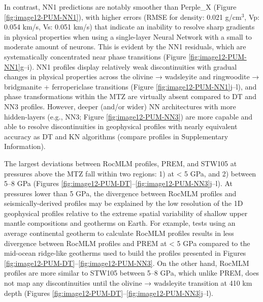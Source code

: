 \documentclass[draft,linenumbers]{agujournal2018}
\begin{document}
In contrast, NN1 predictions are notably smoother than Perple\_X (Figure \ref{fig:image12-PUM-NN1}), with higher errors (RMSE for density: 0.021 g/cm\(^3\), Vp: 0.054 km/s, Vs: 0.051 km/s) that indicate an inability to resolve sharp gradients in physical properties when using a single-layer Neural Network with a small to moderate amount of neurons. This is evident by the NN1 residuals, which are systematically concentrated near phase transitions (Figure \ref{fig:image12-PUM-NN1}g--i). NN1 profiles display relatively weak discontinuities with gradual changes in physical properties across the olivine → wadsleyite and ringwoodite → bridgmanite + ferropericlase transitions (Figure \ref{fig:image12-PUM-NN1}j--l), and phase transformations within the MTZ are virtually absent compared to DT and NN3 profiles. However, deeper (and/or wider) NN architectures with more hidden-layers (e.g., NN3; Figure \ref{fig:image12-PUM-NN3}) are more capable and able to resolve discontinuities in geophysical profiles with nearly equivalent accuracy as DT and KN algorithms (compare profiles in Supplementary Information).

The largest deviations between RocMLM profiles, PREM, and STW105 at pressures above the MTZ fall within two regions: 1) at \textless{} 5 GPa, and 2) between 5--8 GPa (Figures \ref{fig:image12-PUM-DT}--\ref{fig:image12-PUM-NN3}j--l). At pressures lower than 5 GPa, the divergence between RocMLM profiles and seismically-derived profiles may be explained by the low resolution of the 1D geophysical profiles relative to the extreme spatial variability of shallow upper mantle compositions and geotherms on Earth. For example, tests using an average continental geotherm to calculate RocMLM profiles results in less divergence between RocMLM profiles and PREM at \textless{} 5 GPa compared to the mid-ocean ridge-like geotherms used to build the profiles presented in Figures \ref{fig:image12-PUM-DT}--\ref{fig:image12-PUM-NN3}. On the other hand, RocMLM profiles are more similar to STW105 between 5--8 GPa, which unlike PREM, does not map any discontinuities until the olivine → wadsleyite transition at 410 km depth (Figures \ref{fig:image12-PUM-DT}--\ref{fig:image12-PUM-NN3}j--l).
\end{document}
